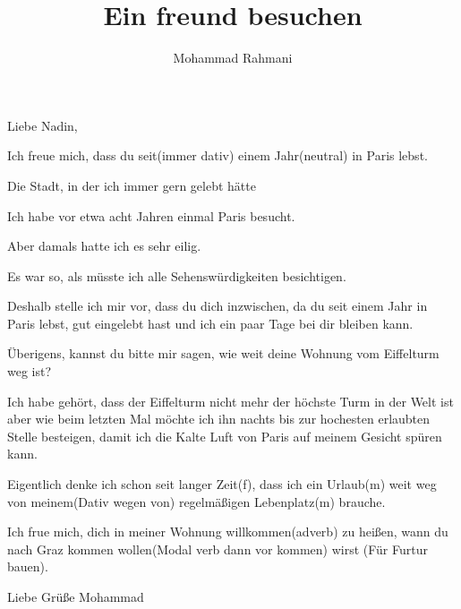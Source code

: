 \documentclass[a4paper]{article}
\title{Ein freund besuchen}
\date{}
\author{Mohammad Rahmani}
\begin{document}
\maketitle
    Liebe Nadin,

    Ich freue mich, dass du seit(immer dativ) einem Jahr(neutral) in Paris lebst.
    
    Die Stadt, in der ich immer gern gelebt hätte
    
    Ich habe vor etwa acht Jahren einmal Paris besucht.
    
    Aber damals hatte ich es sehr eilig.
    
    Es war so, als müsste ich alle Sehenswürdigkeiten besichtigen.
    
    Deshalb stelle ich mir vor, dass du dich inzwischen, da du seit einem Jahr in Paris lebst, gut eingelebt hast und ich ein paar Tage bei dir bleiben kann.

    Überigens,  kannst du bitte mir sagen, wie weit deine Wohnung vom Eiffelturm weg ist?
    
    Ich habe gehört, dass der Eiffelturm nicht mehr der höchste Turm in der Welt ist aber wie beim letzten Mal möchte ich ihn nachts bis zur hochesten erlaubten Stelle besteigen, damit ich die Kalte Luft von Paris auf meinem Gesicht spüren kann.
    
    Eigentlich denke ich schon seit langer Zeit(f), dass ich ein Urlaub(m) weit weg von meinem(Dativ wegen von) regelmäßigen Lebenplatz(m) brauche.
    
    Ich frue mich, dich in meiner Wohnung willkommen(adverb) zu heißen, wann du nach Graz kommen wollen(Modal verb dann vor kommen) wirst (Für Furtur bauen).

    Liebe Grüße
    Mohammad

    
    
    
\end{document}
